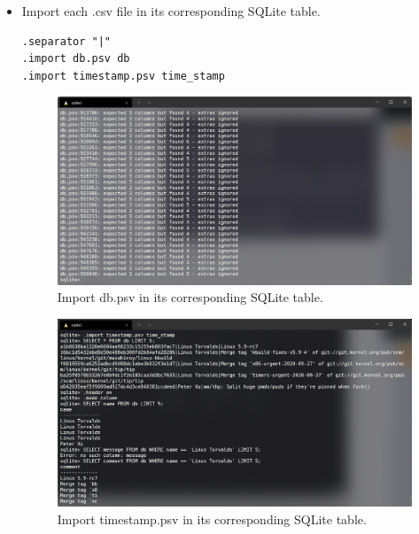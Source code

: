 \documentclass[a4paper]{article}
\begin{document}
\begin{itemize}
\begin{figure}[H]
    \end{figure}
    \item Import each .csv file in its corresponding SQLite table.
    \begin{verbatim}
.separator "|"
.import db.psv db
.import timestamp.psv time_stamp
    \end{verbatim}
    \begin{figure}[H]
        \centering
        \includegraphics[width=1\textwidth]{6.png}
        \caption{Import db.psv in its corresponding SQLite table.}
    \end{figure}
    \begin{figure}[H]
        \centering
        \includegraphics[width=1\textwidth]{7.png}
        \caption{Import timestamp.psv in its corresponding SQLite table.}
    \end{figure}
\end{itemize}
\end{document}
